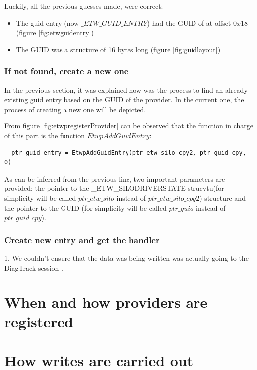   Luckily, all the previous guesses made, were correct:
  \begin{itemize}
    \item The guid entry (now $\_ETW\_GUID\_ENTRY$) had the GUID of at offset $0x18$ (figure \ref{fig:etwguidentry})
    \item The GUID was a structure of 16 bytes long (figure \ref{fig:guidlayout})
  \end{itemize}









\subsubsection{If not found, create a new one}
In the previous section, it was explained how was the process to find an already existing guid entry based on the GUID of the provider. In the current one, the process of creating a new one will be depicted. 

From figure \ref{fig:etwpregisterProvider} can be observed that the function in charge of this part is the function $EtwpAddGuidEntry$:

\begin{verbatim}
  ptr_guid_entry = EtwpAddGuidEntry(ptr_etw_silo_cpy2, ptr_guid_cpy, 0)
\end{verbatim}

As can be inferred from the previous line, two important parameters are provided: the pointer to the \_ETW\_SILODRIVERSTATE strucvtu(for simplicity will be called $ptr\_etw\_silo$ instead of $ptr\_etw\_silo\_cpy2$) structure and the pointer to the GUID (for simplicity will be called $ptr\_guid$ instead of $ptr\_guid\_cpy$).


\subsubsection{Create new entry and get the handler }

\newpage
{\huge 1. We couldn't ensure that the data was being written was actually going to the DiagTrack session .}

\section{When and how providers are registered}
\section{How writes are carried out}
